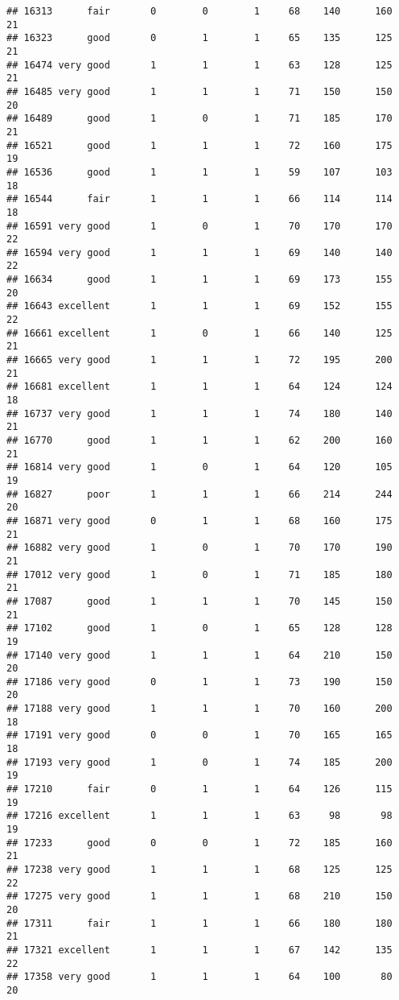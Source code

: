 \documentclass[]{article}
\begin{document}
\begin{verbatim}
## 16313      fair       0        0        1     68    140      160  21
## 16323      good       0        1        1     65    135      125  21
## 16474 very good       1        1        1     63    128      125  21
## 16485 very good       1        1        1     71    150      150  20
## 16489      good       1        0        1     71    185      170  21
## 16521      good       1        1        1     72    160      175  19
## 16536      good       1        1        1     59    107      103  18
## 16544      fair       1        1        1     66    114      114  18
## 16591 very good       1        0        1     70    170      170  22
## 16594 very good       1        1        1     69    140      140  22
## 16634      good       1        1        1     69    173      155  20
## 16643 excellent       1        1        1     69    152      155  22
## 16661 excellent       1        0        1     66    140      125  21
## 16665 very good       1        1        1     72    195      200  21
## 16681 excellent       1        1        1     64    124      124  18
## 16737 very good       1        1        1     74    180      140  21
## 16770      good       1        1        1     62    200      160  21
## 16814 very good       1        0        1     64    120      105  19
## 16827      poor       1        1        1     66    214      244  20
## 16871 very good       0        1        1     68    160      175  21
## 16882 very good       1        0        1     70    170      190  21
## 17012 very good       1        0        1     71    185      180  21
## 17087      good       1        1        1     70    145      150  21
## 17102      good       1        0        1     65    128      128  19
## 17140 very good       1        1        1     64    210      150  20
## 17186 very good       0        1        1     73    190      150  20
## 17188 very good       1        1        1     70    160      200  18
## 17191 very good       0        0        1     70    165      165  18
## 17193 very good       1        0        1     74    185      200  19
## 17210      fair       0        1        1     64    126      115  19
## 17216 excellent       1        1        1     63     98       98  19
## 17233      good       0        0        1     72    185      160  21
## 17238 very good       1        1        1     68    125      125  22
## 17275 very good       1        1        1     68    210      150  20
## 17311      fair       1        1        1     66    180      180  21
## 17321 excellent       1        1        1     67    142      135  22
## 17358 very good       1        1        1     64    100       80  20

\end{verbatim}
\end{document}
